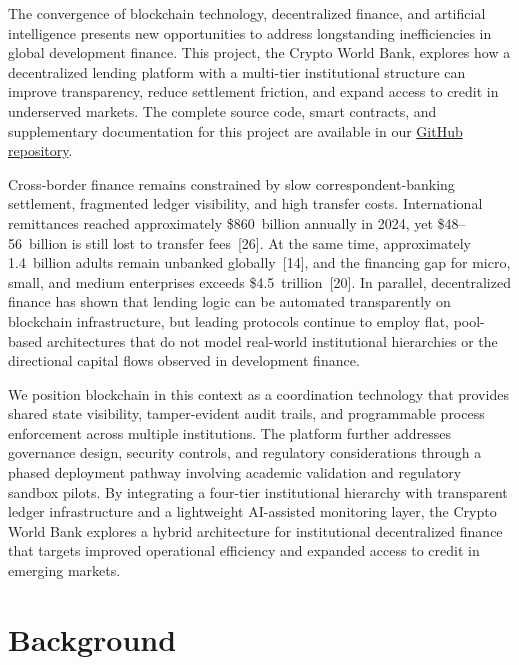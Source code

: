 \documentclass[12pt,a4paper]{report}
\begin{document}
The convergence of blockchain technology, decentralized finance, and artificial intelligence presents new opportunities to address longstanding inefficiencies in global development finance. This project, the Crypto World Bank, explores how a decentralized lending platform with a multi-tier institutional structure can improve transparency, reduce settlement friction, and expand access to credit in underserved markets. The complete source code, smart contracts, and supplementary documentation for this project are available in our \href{https://github.com/Yuvraajrahman/Cryto-World-Bank}{GitHub repository}.

Cross-border finance remains constrained by slow correspondent-banking settlement, fragmented ledger visibility, and high transfer costs. International remittances reached approximately \$860~billion annually in 2024, yet \$48--56~billion is still lost to transfer fees~[26]. At the same time, approximately 1.4~billion adults remain unbanked globally~[14], and the financing gap for micro, small, and medium enterprises exceeds \$4.5~trillion~[20]. In parallel, decentralized finance has shown that lending logic can be automated transparently on blockchain infrastructure, but leading protocols continue to employ flat, pool-based architectures that do not model real-world institutional hierarchies or the directional capital flows observed in development finance.

We position blockchain in this context as a coordination technology that provides shared state visibility, tamper-evident audit trails, and programmable process enforcement across multiple institutions. The platform further addresses governance design, security controls, and regulatory considerations through a phased deployment pathway involving academic validation and regulatory sandbox pilots. By integrating a four-tier institutional hierarchy with transparent ledger infrastructure and a lightweight AI-assisted monitoring layer, the Crypto World Bank explores a hybrid architecture for institutional decentralized finance that targets improved operational efficiency and expanded access to credit in emerging markets.

\section{Background}
\end{document}
